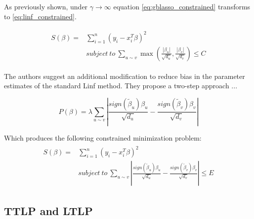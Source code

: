 As previously shown, under $\gamma\rightarrow\infty$ equation \ref{eq:gblasso_constrained} transforms to \ref{eq:linf_constrained}. 

\begin{align} \label{eq:linf_constrained}
\begin{split}
S(\beta) = &\sum_{i=1}^{n} (y_i - x_i^T\beta)^2 \\ 
&subject\ to\ \sum_{u \sim v}\max\left(\frac{|\beta_u|}{\sqrt{d_u}},\frac{|\beta_v|}{\sqrt{d_v}}\right)\leq C
\end{split}
\end{align}

The authors suggest an additional modification to reduce bias in the parameter estimates of the standard Linf method. They propose a two-step approach ...

\begin{equation} \label{eq:alinf_pen}
P(\beta) = \lambda\sum_{u \sim v}\left|\frac{sign(\tilde{\beta}_u)\beta_u}{\sqrt{d_u}}-\frac{sign(\tilde{\beta}_v)\beta_v}{\sqrt{d_v}}\right|
\end{equation}

Which produces the following constrained minimization problem:
\begin{align} \label{eq:alinf_constrained}
\begin{split}
S(\beta) = &\sum_{i=1}^{n} (y_i - x_i^T\beta)^2 \\ 
&subject\ to\ \sum_{u \sim v}\left|\frac{sign(\tilde{\beta}_u)\beta_u}{\sqrt{d_u}}-\frac{sign(\tilde{\beta}_v)\beta_v}{\sqrt{d_v}}\right|\leq E
\end{split}
\end{align}


\subsection{TTLP and LTLP}
